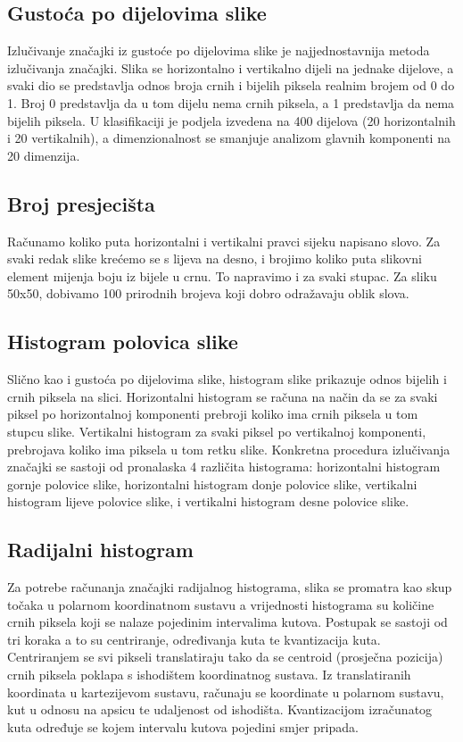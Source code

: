\documentclass[a4paper,twocolumn,dvipdfm]{article}
\begin{document}
\subsection{Gustoća po dijelovima slike}
Izlučivanje značajki iz gustoće po dijelovima slike je najjednostavnija metoda
izlučivanja značajki. Slika se horizontalno i vertikalno dijeli na jednake
dijelove, a svaki dio se predstavlja odnos broja crnih i bijelih piksela realnim
brojem od 0 do 1. Broj 0 predstavlja da u tom dijelu nema crnih piksela, a 1
predstavlja da nema bijelih piksela. U klasifikaciji je podjela izvedena na 400
dijelova (20 horizontalnih i 20 vertikalnih), a dimenzionalnost se smanjuje
analizom glavnih komponenti na 20 dimenzija.

\subsection{Broj presjecišta}
Računamo koliko puta horizontalni i vertikalni pravci sijeku napisano slovo.
Za svaki redak slike krećemo se s lijeva na desno, i brojimo koliko puta
slikovni element mijenja boju iz bijele u crnu. To napravimo i za svaki stupac.
Za sliku 50x50, dobivamo 100 prirodnih brojeva koji dobro odražavaju oblik slova.

\subsection{Histogram polovica slike}
Slično kao i gustoća po dijelovima slike, histogram slike prikazuje odnos 
bijelih i crnih piksela na slici. Horizontalni histogram se računa na način 
da se za svaki piksel po horizontalnoj komponenti prebroji koliko ima crnih 
piksela u tom stupcu slike. Vertikalni histogram za svaki piksel po vertikalnoj 
komponenti, prebrojava koliko ima piksela u tom retku slike. Konkretna 
procedura izlučivanja značajki se sastoji od pronalaska 4 različita histograma: 
horizontalni histogram gornje polovice slike, horizontalni histogram donje 
polovice slike, vertikalni histogram lijeve polovice slike, i vertikalni 
histogram desne polovice slike.

\subsection{Radijalni histogram}
Za potrebe računanja značajki radijalnog histograma, slika se promatra kao skup
točaka u polarnom koordinatnom sustavu a vrijednosti histograma su količine
crnih piksela koji se nalaze pojedinim intervalima kutova. Postupak se sastoji
od tri koraka a to su centriranje, određivanja kuta te kvantizacija kuta.
Centriranjem se svi pikseli translatiraju tako da se centroid (prosječna
pozicija) crnih piksela poklapa s ishodištem koordinatnog sustava. Iz
translatiranih koordinata u kartezijevom sustavu, računaju se koordinate u
polarnom sustavu, kut u odnosu na apsicu te udaljenost od ishodišta.
Kvantizacijom izračunatog kuta određuje se kojem intervalu kutova pojedini smjer
pripada.
\end{document}
